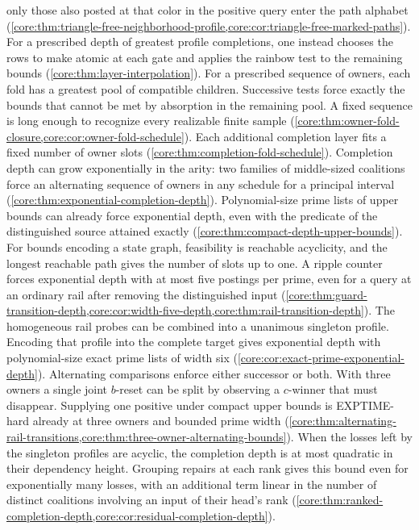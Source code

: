 only those also posted at that color in the positive query enter the
path alphabet
(\cref{core:thm:triangle-free-neighborhood-profile,core:cor:triangle-free-marked-paths}).
For a prescribed depth of greatest profile completions, one instead
chooses the rows to make atomic at each gate and applies the rainbow
test to the remaining bounds (\cref{core:thm:layer-interpolation}).
For a prescribed sequence of owners, each fold has a greatest pool of
compatible children. Successive tests force exactly the bounds that
cannot be met by absorption in the remaining pool. A fixed sequence
is long enough to recognize every realizable finite sample
(\cref{core:thm:owner-fold-closure,core:cor:owner-fold-schedule}).
Each additional completion layer fits a fixed number of owner slots
(\cref{core:thm:completion-fold-schedule}).
Completion depth can grow exponentially in the arity: two families
of middle-sized coalitions force an alternating sequence of owners
in any schedule for a principal interval
(\cref{core:thm:exponential-completion-depth}). Polynomial-size prime
lists of upper bounds can already force exponential depth, even
with the predicate of the distinguished source attained exactly
(\cref{core:thm:compact-depth-upper-bounds}). For bounds encoding
a state graph, feasibility is reachable acyclicity, and the longest
reachable path gives the number of slots up to one. A ripple counter
forces exponential depth with at most five postings per prime, even
for a query at an ordinary rail after removing the distinguished input
(\cref{core:thm:guard-transition-depth,core:cor:width-five-depth,core:thm:rail-transition-depth}).
The homogeneous rail probes can be combined into a unanimous
singleton profile. Encoding that profile into the complete target
gives exponential depth with polynomial-size exact prime lists of
width six (\cref{core:cor:exact-prime-exponential-depth}).
Alternating comparisons enforce either successor or both. With
three owners a single joint $b$-reset can be split by observing a
$c$-winner that must disappear. Supplying one positive under compact
upper bounds is EXPTIME-hard already at three owners and bounded
prime width
(\cref{core:thm:alternating-rail-transitions,core:thm:three-owner-alternating-bounds}).
When the losses left by the singleton profiles are acyclic, the
completion depth is at most quadratic in their dependency height.
Grouping repairs at each rank gives this bound even for exponentially
many losses, with an additional term linear in the number of distinct
coalitions involving an input of their head's rank
(\cref{core:thm:ranked-completion-depth,core:cor:residual-completion-depth}).

